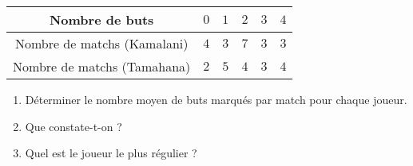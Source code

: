 \documentclass[a4paper,dvipsnames]{article}
\begin{document}
\begin{center}
  \begin{tabular}{@{}cccccc@{}}
    \toprule
    Nombre de buts & $0$ & $1$ & $2$ & $3$ & $4$ \\
    \midrule
    Nombre de matchs (Kamalani) & $4$ & $3$ & $7$ & $3$ & $3$\\
    Nombre de matchs (Tamahana) & $2$ & $5$ & $4$ & $3$ & $4$\\
    \bottomrule
  \end{tabular}
\end{center}

\begin{enumerate}
  \item Déterminer le nombre moyen de buts marqués par match pour chaque joueur.
  \item Que constate-t-on ?
  \item Quel est le joueur le plus régulier ?
\end{enumerate}
\end{document}

